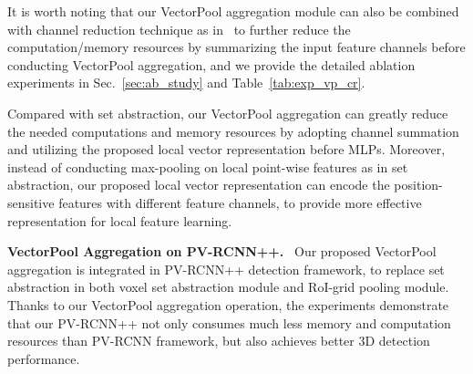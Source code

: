 \documentclass[natbib,twocolumn]{svjour3}          \smartqed  \usepackage{graphicx}
\begin{document}
It is worth noting that our VectorPool aggregation module can also be combined with channel reduction technique as in~\citep{sun2018fishnet} to further reduce the computation/memory resources by summarizing the input feature channels before conducting VectorPool aggregation, and we provide the detailed ablation experiments in Sec.~\ref{sec:ab_study} and Table~\ref{tab:exp_vp_cr}.


Compared with set abstraction, our VectorPool aggregation can greatly reduce the needed computations and memory resources by adopting channel summation and utilizing the proposed local vector representation before MLPs. 
Moreover, instead of conducting max-pooling on local point-wise features as in set abstraction, 
our proposed local vector representation can encode the position-sensitive features with different feature channels, to provide more effective representation for local feature learning.  

\noindent
\textbf{VectorPool Aggregation on PV-RCNN++.}~
Our proposed VectorPool aggregation is integrated in PV-RCNN++ detection framework, to replace set abstraction in both voxel set abstraction module and RoI-grid pooling module. 
Thanks to our VectorPool aggregation operation, the experiments demonstrate that our PV-RCNN++ not only consumes much less memory and computation resources than PV-RCNN framework, but also achieves better 3D detection performance.
\end{document}
